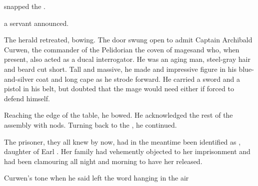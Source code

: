  snapped the \rinyuth. 

 a servant announced. 



The herald retreated, bowing. The door swung open to admit Captain Archibald Curwen, the commander of the Pelidorian \dash the coven of mages\dash and who, when present, also acted as a ducal interrogator. 
He was an aging man, steel-gray hair and beard cut short. Tall and massive, he made and impressive figure in his blue-and-silver coat and long cape as he strode forward. 
He carried a sword and a pistol in his belt, but \Tiroco{} doubted that the mage would need either if forced to defend himself. 

Reaching the edge of the table, he bowed. 
He acknowledged the rest of the assembly with nods. 
Turning back to the \rinyuth, he continued. 



The prisoner, they all knew by now, had in the meantime been identified as \Constance{} \Kintaer{}, daughter of Earl \Theal{} \Kintaer{}. Her family had vehemently objected to her imprisonment and had been clamouring all night and morning to have her released. 

\dash Curwen's tone when he said  left the word  hanging in the air\dash{} 


